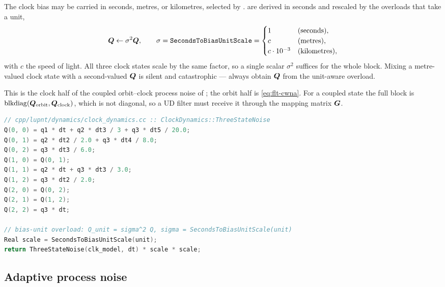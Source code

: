 \begin{lupntnote}
The clock bias may be carried in seconds, metres, or kilometres, selected by
.  are derived in
seconds and rescaled by the overloads that take a unit,
\begin{equation}
  \label{eq:flt-clock-scale}
  \bm{Q} \leftarrow \sigma^2 \bm{Q},
  \qquad
  \sigma = \texttt{SecondsToBiasUnitScale} =
  \begin{cases}
    1 & \text{(seconds)}, \\
    c & \text{(metres)}, \\
    c \cdot 10^{-3} & \text{(kilometres)},
  \end{cases}
\end{equation}
with $c$ the speed of light. All three clock states scale by the same factor,
so a single scalar $\sigma^2$ suffices for the whole block. Mixing a
metre-valued clock state with a second-valued $\bm{Q}$ is silent and
catastrophic --- always obtain $\bm{Q}$ from the unit-aware overload.
\end{lupntnote}

This is the clock half of the coupled orbit--clock process noise of
\citep[Ch.~6.1.2, Eq.~6.6]{iiyama2026thesis}; the orbit half is
\cref{eq:flt-cwna}. For a coupled state the full block is
$\operatorname{blkdiag}(\bm{Q}_{\text{orbit}}, \bm{Q}_{\text{clock}})$, which
is not diagonal, so a UD filter must receive it through the mapping matrix
$\bm{G}$.

\begin{lstlisting}[language=cpp, caption={Three-state clock process noise and the unit rescaling.},
                   label={lst:flt-clock}]
// cpp/lupnt/dynamics/clock_dynamics.cc :: ClockDynamics::ThreeStateNoise
Q(0, 0) = q1 * dt + q2 * dt3 / 3 + q3 * dt5 / 20.0;
Q(0, 1) = q2 * dt2 / 2.0 + q3 * dt4 / 8.0;
Q(0, 2) = q3 * dt3 / 6.0;
Q(1, 0) = Q(0, 1);
Q(1, 1) = q2 * dt + q3 * dt3 / 3.0;
Q(1, 2) = q3 * dt2 / 2.0;
Q(2, 0) = Q(0, 2);
Q(2, 1) = Q(1, 2);
Q(2, 2) = q3 * dt;

// bias-unit overload: Q_unit = sigma^2 Q, sigma = SecondsToBiasUnitScale(unit)
Real scale = SecondsToBiasUnitScale(unit);
return ThreeStateNoise(clk_model, dt) * scale * scale;
\end{lstlisting}

\subsection{Adaptive process noise}
\label{sec:flt-adaptive}

